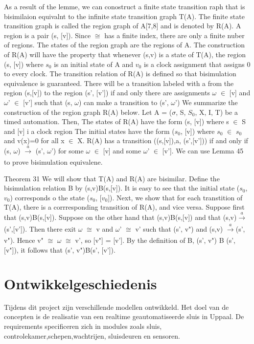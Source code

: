 \documentclass{article}
\begin{document}
	As a result of the lemme, we can conostruct a finite state transition raph that is  bisimilaion equivalnt to the infinite state transition graph T(A). The finite state transition graph is called the region graph of A[7,8] and is denoted by R(A). A region is a pair (s, [v]). Since $\cong$  has a finite index, there are only a finite nuber of regions. The states of the region graph are  the regions of A. The construction of R(A) will have the property that whenever (s,v) is a state of T(A), the region (s, [v]) where $s_0$ is an initial state of A and $v_0$ is a clock assignment that assigns 0 to every clock. The transition relation of R(A) is defined so that bisimulation equivalence is guaranteed. There will be a transition labeled with a from the region (s,[v]) to the region (s', [v']) if and only there are assignments $\omega$ $\in$ [v] and $\omega$' $\in$ [v'] such that (s, $\omega$) can make a transition to (s', $\omega$')
	\cite[p~278]{clarkmodelchecking}
	We summarize the construction of the region graph R(A) below. Let A = ($\sigma$, S, $S_0$, X, I, T) be a timed automation. Then,
	The states of R(A) have the form (s, [v]) where s $\in$ S and [v] i a clock region
	The initial states have the form ($s_0$, [v]) where $s_0$ $\in$ $s_0$ and v(x)=0 for all x $\in$ X.
	R(A) has a transition ((s,[v]),a, (s',[v'])) if and only if (s, $\omega$)  $\xrightarrow[]{a}$  (s', $\omega$') for some $\omega$ $\in$ [v] and some $\omega$' $\in$ [v'].
	We can use Lemma 45 to prove bisimulation equivalene.
	
	Theorem 31
	We will show that T(A) and R(A) are bisimilar. Define the bisimulation relation B by (s,v)B(s,[v]). It is easy to see that the initial state ($s_0$, $v_0$) corresponds o the  state ($s_0$, [$v_0$]). Next, we show that for each transtition of T(A), there is a corrresponding transition  of R(A), and vice versa. Suppose first that (s,v)B(s,[v]). Suppose on the other hand that (s,v)B(s,[v]) and that  (s,v)$\xrightarrow[]{a}$(s',[v']). Then there exit $\omega$ $\cong$ v and $\omega$' $\cong$ v' such that (s', v") and (s,v) $\xrightarrow[]{a}$(s', v"). Hence v" $\cong$ $\omega$ $\cong$ v', so [v"] = [v']. By the definition of B, (s', v") B (s', [v"]), it follows that (s', v")B(s', [v']).
	\cite[p~279]{clarkmodelchecking}
	
	
	\section{Ontwikkelgeschiedenis}
	
	Tijdens dit project zijn verschillende modellen ontwikkeld. Het doel van de concepten is de realisatie van een realtime geautomatiseerde sluis in Uppaal. De requirements specificeren zich in modules zoals sluis, controlekamer,schepen,wachtrijen, sluisdeuren en sensoren.
	
\end{document}

